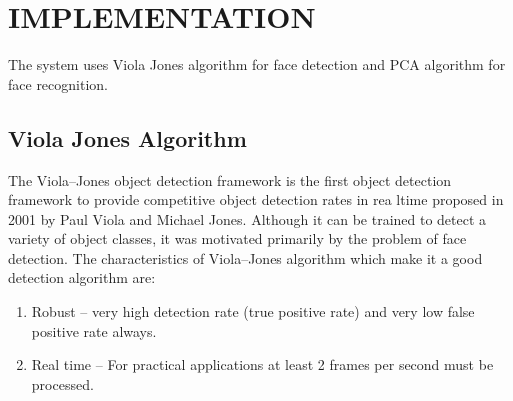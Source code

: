 \documentclass[a4paper, 12pt]{report}
\begin{document}
\section{IMPLEMENTATION}
The system uses Viola Jones algorithm for face detection and PCA algorithm for face
recognition.
\subsection{Viola Jones Algorithm}
The Viola–Jones object detection framework is the first object detection framework to
provide competitive object detection rates in rea ltime proposed in 2001 by Paul Viola and
Michael Jones. Although it can be trained to detect a variety of object classes, it was motivated
primarily by the problem of face detection. The characteristics of Viola–Jones algorithm which
make it a good detection algorithm are:
\begin{enumerate}

\item
 Robust – very high detection rate (true positive rate) and very low false positive rate
always.
\item
Real time – For practical applications at least 2 frames per second must be processed.
\end{enumerate}
\end{document}
